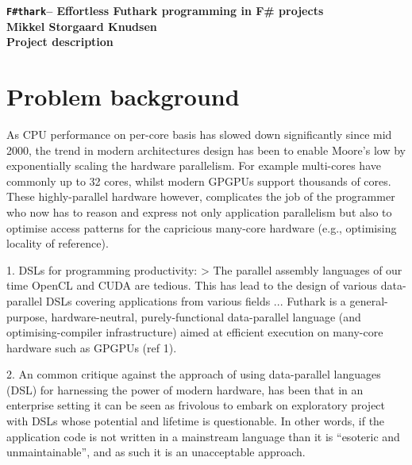 \documentclass{article}
\newcommand{\fshark}{\texttt{F\#thark}}
\begin{document}
\noindent
\textbf{
    \fshark \--- Effortless Futhark programming in F# projects \\
    Mikkel Storgaard Knudsen\\
    Project description    
}

\section{Problem background}

As CPU performance on per-core basis has slowed down significantly since
mid 2000, the trend in modern architectures design has been to enable 
Moore's low by exponentially scaling the hardware parallelism. 
For example multi-cores have commonly up to 32 cores, whilst modern 
GPGPUs support thousands of cores.
These highly-parallel hardware however, complicates the job of the 
programmer who now has to reason and express not only application 
parallelism but also to optimise access patterns for the capricious 
many-core hardware (e.g., optimising locality of reference).

1. DSLs for programming productivity: >
The parallel assembly languages of our time OpenCL and CUDA are tedious.
This has lead to the design of various data-parallel DSLs covering 
applications from various fields ...
Futhark is a general-purpose, hardware-neutral, purely-functional data-parallel 
language (and optimising-compiler infrastructure) aimed at efficient execution 
on many-core hardware such as GPGPUs (ref 1). 

2. An common critique against the approach of using data-parallel languages (DSL) 
for harnessing the power of modern hardware, has been that in an enterprise 
setting it can be seen as frivolous to embark on exploratory project with 
DSLs whose potential and lifetime is questionable.  In other words, if the
application code is not written in a mainstream language than it is ``esoteric
and unmaintainable'', and as such it is an unacceptable approach.
\end{document}
